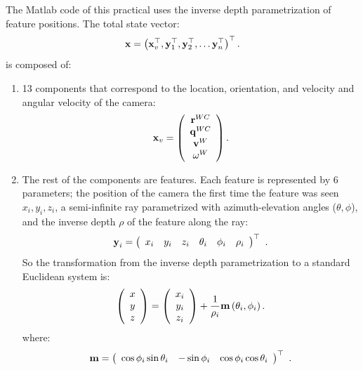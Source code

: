 \documentclass[a4paper,12pt]{article}
\begin{document}
The Matlab code of this practical uses the inverse depth
parametrization of feature positions. The total state
vector:
\begin{equation}
\mbox{$\mathbf{x}$}=\left(\mbox{$\mathbf{x}$}_v^\top, \mbox{$\mathbf{y}$}_1^\top, \mbox{$\mathbf{y}$}_2^\top, \ldots
\mbox{$\mathbf{y}$}_n^\top\right)^\top.
\end{equation}
is composed of:
\begin{enumerate}
\item 13 components that correspond to the location, orientation, and
velocity and angular velocity of
the camera:
\begin{equation}
\mbox{$\mathbf{x}$}_v=\left(\begin{array}{c}\mbox{$\mathbf{r}$}^{WC}\\\mbox{$\mathbf{q}$}^{WC}\\\mbox{$\mathbf{v}$}^{W}\\\mbox{$\mathbf{\omega}$}^{W}\end{array}\right).
\end{equation}

\item The rest of the components are features. Each feature is represented by 6 parameters;
 the position of the camera the first time the feature was
 seen $x_i,  y_i,  z_i$, a semi-infinite ray parametrized with azimuth-elevation angles ($\theta,\phi$), 
 and the inverse depth $\rho$ of the feature along the ray:
\begin{equation}
\mbox{$\mathbf{y}$}_i=\left(\begin{array}{cccccc}x_i & y_i & z_i & \theta_i &
\phi_i & \rho_i\end{array}\right)^\top
~.
\end{equation}
So the transformation from the inverse depth parametrization to a
standard 
Euclidean system is:
\begin{equation}
\left(\begin{array}{c}x\\y\\z\end{array}\right)=\left(\begin{array}{c}x_i\\y_i\\z_i\end{array}\right)+
                    \frac{1}{\rho_i}\mbox{$\mathbf{m}$}\left(\theta_i,
                    \phi_i\right).
\end{equation}
where:
\begin{equation}
\mbox{$\mathbf{m}$}=\left(\begin{array}{ccc}\cos\phi_i \sin\theta_i&
                     -\sin\phi_i&
                     \cos\phi_i \cos\theta_i\end{array}\right)^\top
                     \label{eq-m}
~.
\end{equation}

\end{enumerate}
\end{document}
